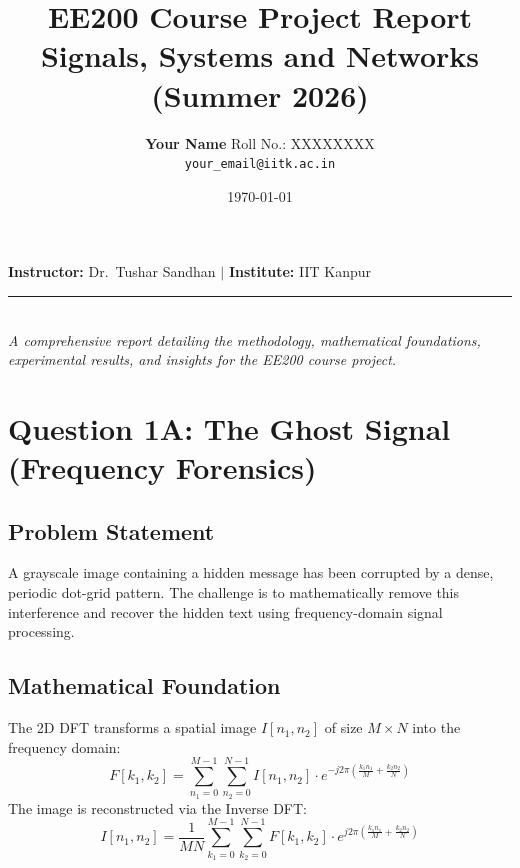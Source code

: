 \documentclass[12pt,a4paper]{article}
\title{
    \vspace{-1.5cm}
    {\Huge\sffamily\bfseries\color{iitkblue} EE200 Course Project Report}\\[0.6em]
    {\Large\color{gray} Signals, Systems and Networks (Summer 2026)}
}
\author{\Large \textbf{Your Name} \quad Roll No.: XXXXXXXX \\ \texttt{your\_email@iitk.ac.in}}
\date{\today}
\begin{document}
\maketitle
\thispagestyle{empty}

\begin{center}
    \large \textbf{Instructor:} Dr.\ Tushar Sandhan \quad $\vert$ \quad \textbf{Institute:} IIT Kanpur \\[0.3em]
    \rule{0.8\textwidth}{0.5pt}\\[0.3em]
    \textit{A comprehensive report detailing the methodology, mathematical foundations, experimental results, and insights for the EE200 course project.}
\end{center}

\vspace{0.8cm}
\tableofcontents
\clearpage

\section{Question 1A: The Ghost Signal (Frequency Forensics)}

\subsection{Problem Statement}
A grayscale image containing a hidden message has been corrupted by a dense, periodic dot-grid pattern. The challenge is to mathematically remove this interference and recover the hidden text using frequency-domain signal processing.

\subsection{Mathematical Foundation}

\begin{math_box}
The 2D DFT transforms a spatial image $I[n_1, n_2]$ of size $M \times N$ into the frequency domain:
\begin{equation}
    F[k_1, k_2] = \sum_{n_1=0}^{M-1} \sum_{n_2=0}^{N-1} I[n_1, n_2] \cdot e^{-j2\pi\left(\frac{k_1 n_1}{M} + \frac{k_2 n_2}{N}\right)}
\end{equation}
The image is reconstructed via the Inverse DFT:
\begin{equation}
    I[n_1, n_2] = \frac{1}{MN} \sum_{k_1=0}^{M-1} \sum_{k_2=0}^{N-1} F[k_1, k_2] \cdot e^{j2\pi\left(\frac{k_1 n_1}{M} + \frac{k_2 n_2}{N}\right)}
\end{equation}
\end{math_box}
\end{document}
